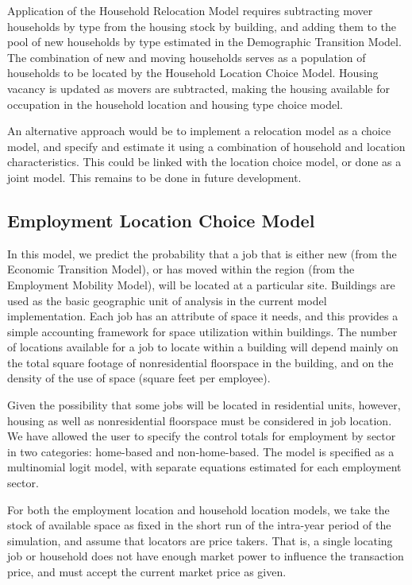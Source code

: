 Application of the Household Relocation Model requires subtracting
mover households by type from the housing stock by building, and
adding them to the pool of new households by type estimated in the
Demographic Transition Model. The combination of new and moving
households serves as a population of households to be located by
the Household Location Choice Model. Housing vacancy is updated as
movers are subtracted, making the housing available for occupation
in the household location and housing type choice model.

An alternative approach would be to implement a relocation model
as a choice model, and specify and estimate it using a combination of household
and location characteristics.  This could be linked with the location choice model,
or done as a joint model.  This remains to be done in future development.


\subsection{Employment Location Choice Model}
%
\label{sec:model-system-employment-location-choice-model}
%
In this model, we predict the probability that a job that is
either new (from the Economic Transition Model), or has moved
within the region (from the Employment Mobility Model), will be
located at a particular site.  Buildings are used as the basic
geographic unit of analysis in the current model implementation.
Each job has an attribute of space it needs, and this provides
a simple accounting framework for space utilization within
buildings. The
number of locations available for a job to locate within a building
will depend mainly on the total square footage of
nonresidential floorspace in the building, and on the density of the
use of space (square feet per employee).

Given the possibility
that some jobs will be located in residential units, however,
housing as well as nonresidential floorspace must be considered in
job location.  We have allowed the user to specify the control totals
for employment by sector in two categories: home-based and
non-home-based.  The model is specified as a multinomial logit model,
with separate equations estimated for each employment sector.


For both the employment location and household location models, we
take the stock of available space as fixed in the short run of the
intra-year period of the simulation, and assume that locators are
price takers.  That is, a single locating job or household does
not have enough market power to influence the transaction price,
and must accept the current market price as given.

